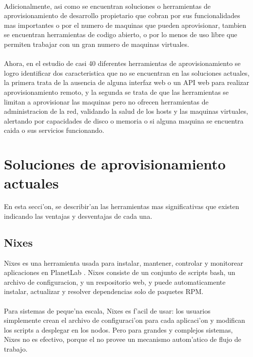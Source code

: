 \\
Adicionalmente, asi como se encuentran soluciones o herramientas de aprovisionamiento de desarrollo propietario que cobran por sus funcionalidades mas importantes o por el numero de maquinas que pueden aprovisionar, tambien se encuentran herramientas de codigo abierto, o por lo menos de uso libre que permiten trabajar con un gran numero de maquinas virtuales.\\
\\
Ahora, en el estudio de casi 40 diferentes herramientas de aprovisionamiento se logro identificar dos caracteristica que no se encuentran en las soluciones actuales, la primera trata de la ausencia de alguna interfaz web o un API web para realizar aprovisionamiento remoto, y la segunda se trata de que las herramientas se limitan a aprovisionar las maquinas pero no ofrecen herramientas de administracion de la red, validando la salud de los hosts y las maquinas virtuales, alertando por capacidades de disco o memoria o si alguna maquina se encuentra caida o sus servicios funcionando. \\




\section{Soluciones de aprovisionamiento actuales}
En esta secci'on, se describir'an las herramientas mas significativas que existen indicando las ventajas y desventajas de cada una.

\subsection{Nixes}
Nixes es una herramienta usada para instalar, mantener, controlar y monitorear aplicaciones en PlanetLab \cite{Nixes13}. Nixes consiste de un conjunto de scripts bash, un archivo de configuracion, y un respositorio web, y puede automaticamente instalar, actualizar y resolver dependencias solo de paquetes RPM.\\
\\
Para sistemas de peque'na escala, Nixes es f'acil de usar: los usuarios simplemente crean el archivo de configuraci'on para cada aplicaci'on y modifican los scripts a desplegar en los nodos. Pero para grandes y complejos sistemas, Nixes no es efectivo, porque el no provee un mecanismo autom'atico de flujo de trabajo.

